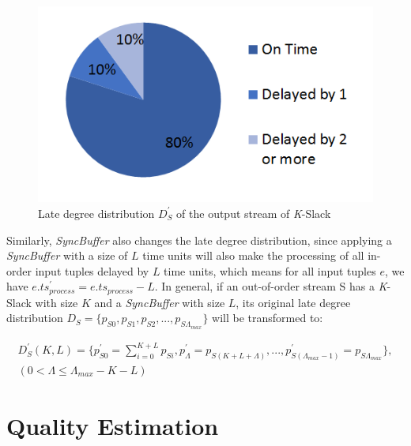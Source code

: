 \documentclass[a4paper, 11pt, twoside]{report}
\begin{document}
\begin{figure}[h]
\centering
\includegraphics[scale=0.75]{late_degree_distribution2}
\caption{Late degree distribution $D_S^{\prime}$ of the output stream of \textit{K}-Slack \label{fig:late_degree_distribution2}}
\end{figure}

Similarly, \textit{SyncBuffer} also changes the late degree distribution, since applying a \textit{SyncBuffer} with a size of $L$ time units will also make the processing of all in-order input tuples delayed by $L$ time units, which means for all input tuples $e$, we have $e.ts^{\prime}_{process}=e.ts_{process}-L$. In general, if an out-of-order stream S has a \textit{K}-Slack with size $K$ and a \textit{SyncBuffer} with size $L$, its original late degree distribution $D_S= \{p_{S0}, p_{S1}, p_{S2}, ..., p_{S\Lambda_{max}}\}$ will be transformed to:

\begin{equation}
\label{eq:distibution_transform}
\begin{split}
D_S^{\prime}(K,L)= \{p^{\prime}_{S0}= \sum\limits_{i=0}^{K+L}p_{Si}, p^{\prime}_{\Lambda}=p_{S(K+L+\Lambda)}, ..., p^{\prime}_{S(\Lambda_{max}-1)} = p_{S\Lambda_{max}}\}, \\
(0 < \Lambda \leq \Lambda_{max}-K-L)
\end{split}
\end{equation}

%
%

\section{Quality Estimation}
\label{sec:quality-estimation}
\end{document}
